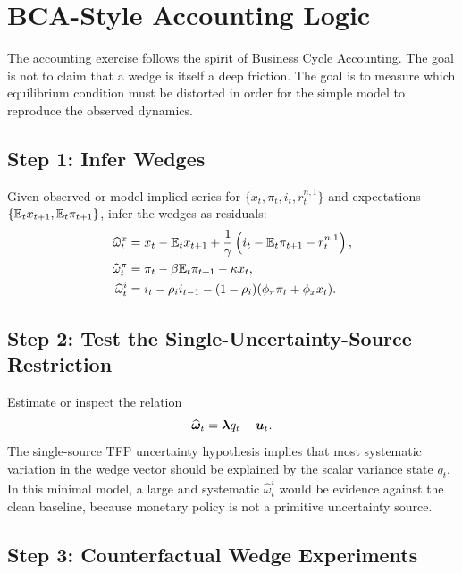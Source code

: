 \section{BCA-Style Accounting Logic}

The accounting exercise follows the spirit of Business Cycle Accounting. The
goal is not to claim that a wedge is itself a deep friction. The goal is to
measure which equilibrium condition must be distorted in order for the simple
model to reproduce the observed dynamics.

\subsection{Step 1: Infer Wedges}

Given observed or model-implied series for
\(\{x_t,\pi_t,i_t,r^{n,1}_t\}\) and expectations
\(\{\mathbb{E}_t x_{t+1},\mathbb{E}_t \pi_{t+1}\}\), infer the wedges as residuals:
\begin{align}
    \widehat{\omega}^x_t
    &=
    x_t
    -
    \mathbb{E}_t x_{t+1}
    +
    \frac{1}{\gamma}
    \left(
        i_t-\mathbb{E}_t\pi_{t+1}-r^{n,1}_t
    \right),
    \label{eq:infer_x_wedge}
    \\
    \widehat{\omega}^\pi_t
    &=
    \pi_t
    -
    \beta \mathbb{E}_t\pi_{t+1}
    -
    \kappa x_t,
    \label{eq:infer_pi_wedge}
    \\
    \widehat{\omega}^i_t
    &=
    i_t
    -
    \rho_i i_{t-1}
    -
    (1-\rho_i)(\phi_\pi\pi_t+\phi_x x_t).
    \label{eq:infer_i_wedge}
\end{align}

\subsection{Step 2: Test the Single-Uncertainty-Source Restriction}

Estimate or inspect the relation
\begin{equation}
    \widehat{\boldsymbol{\omega}}_t
    =
    \boldsymbol{\lambda} q_t
    +
    \boldsymbol{u}_t.
    \label{eq:estimate_wedge_loadings}
\end{equation}
The single-source TFP uncertainty hypothesis implies that most systematic
variation in the wedge vector should be explained by the scalar variance state
\(q_t\). In this minimal model, a large and systematic \(\widehat{\omega}^i_t\)
would be evidence against the clean baseline, because monetary policy is not a
primitive uncertainty source.

\subsection{Step 3: Counterfactual Wedge Experiments}

